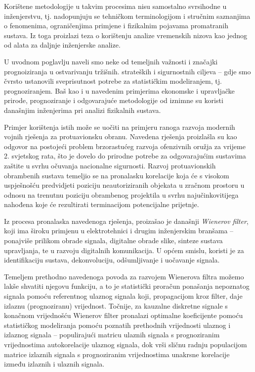 \documentclass[a4paper,12pt,oneside]{memoir}
\begin{document}
                Korištene metodologije u takvim procesima nisu samostalno svrsihodne u inženjerstvu, tj. nadopunjuju se tehničkom terminologijom i stručnim saznanjima o fenomenima, ograničenjima primjene i fizikalnim pojavama promatranih sustava. Iz toga proizlazi teza o korištenju analize vremenskih nizova kao jednog od alata za daljnje inženjerske analize.


                U uvodnom poglavlju naveli smo neke od temeljnih važnosti i značajki prognoiziranja u ostvarivanju tržišnih. strateških i sigurnostnih ciljeva -- gdje smo čvrsto ustanovili sveprisutnost potrebe za statističkim modeliranjem, tj. prognoziranjem. Baš kao i u navedenim primjerima ekonomske i upravljačke prirode, prognoziranje i odgovarajuće metodologije od iznimne su koristi današnjim inženjerima pri analizi fizikalnih sustava. 
                
                Primjer korištenja istih može se uočiti na primjeru ranoga razvoja modernih vojnih rješenja za protuavionsku obranu. Navedena rješenja proizlašla su kao odgovor na postojeći problem brzorastućeg razvoja ofenzivnih oružja za vrijeme 2. svjetskog rata, što je dovelo do prirodne potrebe za odgovarajućim sustavima zaštite u svrhu očuvanja nacionalne  sigurnosti. Razvoj protuavionskih obrambenih sustava temeljio se na pronalasku korelacije koja će s visokom uspješnošću predvidjeti poziciju neautoriziranih objekata u zračnom prostoru u odnosu na trenutnu poziciju obrambenog projektila u svrhu najučinkovitijega nahođena koje će rezultirati terminacijom potencijalne prijetnje.
                
                Iz procesa pronalaska navedenoga rješenja, proizašao je današnji \textit{Wienerov filter}, koji ima široku primjenu u elektrotehnici i drugim inženjerskim branšama -- ponajviše prilikom obrade signala, digitalne obrade slike, sinteze sustava upravljanja, te u razvoju digitalnih komunikacija. U općem smislu, koristi je za identifikaciju sustava, dekonvoluciju, odšumljivanje i uočavanje signala.

                Temeljem prethodno navedenoga povoda za razvojem Wienerova filtra možemo lakše shvatiti njegovu funkciju, a to je statistički proračun ponašanja nepoznatog signala pomoću referentnog ulaznog signala koji, propagacijom kroz filter, daje izlaznu (prognoziranu) vrijednost. Točnije, za kauzalne diskretne signale s konačnom vrijednošću Wienerov filter pronalazi optimalne koeficijente pomoću statističkog modeliranja pomoću poznatih prethodnih vrijednosti ulaznog i izlaznog signala -- populirajući matricu ulaznih signala s prognoziranim vrijednostima autokorelacije ulaznog signala, dok vrši sličnu radnju populacijom matrice izlaznih signala s prognoziranim vrijednostima unakrsne korelacije između izlaznih i ulaznih signala.
\end{document}
